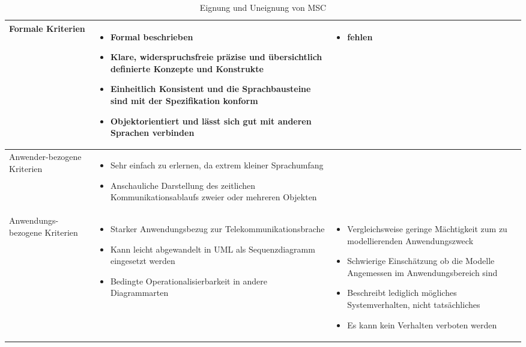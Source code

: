 \begin{table}[ht]
	\begin{tabularx}{\textwidth}{|p{2cm}|X|X|}
		\hline
		Formale	Kriterien &
		\begin{itemize}
			\item Formal beschrieben
			\item Klare, widerspruchsfreie präzise und übersichtlich definierte Konzepte und Konstrukte
			\item Einheitlich Konsistent und die Sprachbausteine sind mit der Spezifikation konform
			\item Objektorientiert und lässt sich gut mit anderen Sprachen verbinden
		\end{itemize}  & 
		\begin{itemize}
			\item fehlen
		\end{itemize} \\
	\hline
	Anwender-bezogene Kriterien &
	\begin{itemize}
		\item Sehr einfach zu erlernen, da extrem kleiner Sprachumfang
		\item Anschauliche Darstellung des zeitlichen Kommunikationsablaufs zweier oder mehreren Objekten
	\end{itemize}  &  \\
		\hline
	Anwendungs-bezogene Kriterien &
		\begin{itemize}
			\item Starker Anwendungsbezug zur Telekommunikationsbrache
			\item Kann leicht abgewandelt in UML als Sequenzdiagramm eingesetzt werden
			\item Bedingte Operationalisierbarkeit in andere Diagrammarten
		\end{itemize}  & 
		\begin{itemize}
			\item Vergleichsweise geringe Mächtigkeit zum zu modellierenden Anwendungszweck
			\item Schwierige Einschätzung ob die Modelle Angemessen im Anwendungsbereich sind
			\item Beschreibt lediglich mögliches Systemverhalten, nicht tatsächliches
			\item Es kann kein Verhalten verboten werden
		\end{itemize} \\
		\hline
	\end{tabularx} 
	\caption{Eignung und Uneignung von MSC}
	\label{tab:EignungMSC}
\end{table} 
